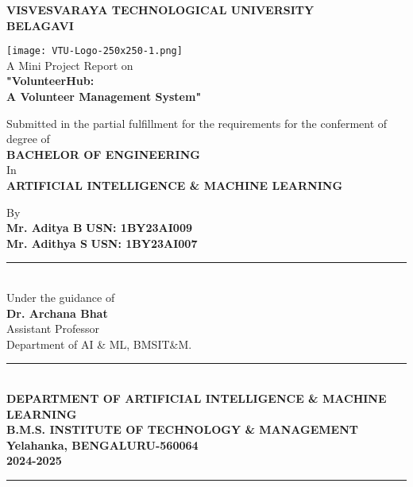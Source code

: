 \documentclass[12pt,a4paper]{report}
\begin{document}
\begin{titlepage}
    \centering
    \vspace*{-1cm}
    
    {\Large\textbf{VISVESVARAYA TECHNOLOGICAL UNIVERSITY}\\ \textbf{BELAGAVI}\\[1.5cm]}
    
    \texttt{[image: VTU-Logo-250x250-1.png]}\\[0.7cm]
    
    {\large A Mini Project Report on\\[0.3cm]}
    {\Huge\textbf{"VolunteerHub:\\[0.3cm] A Volunteer Management System"}\\[0.7cm]}
    
    {\large Submitted in the partial fulfillment for the requirements for the conferment of degree of\\[0.3cm]}
    {\Large\textbf{BACHELOR OF ENGINEERING}\\[0.3cm]}
    {\large In\\[0.3cm]}
    {\Large\textbf{ARTIFICIAL INTELLIGENCE \& MACHINE LEARNING}\\[0.7cm]}
    
    {\large By\\[0.3cm]}
    {\large\textbf{Mr. Aditya B} \hfill \textbf{USN: 1BY23AI009}\\[0.2cm]}
    {\large\textbf{Mr. Adithya S} \hfill \textbf{USN: 1BY23AI007}\\[1.2cm]}
    
    \rule{0.7\textwidth}{0.5pt}\\[0.3cm]
    
    {\large Under the guidance of\\[0.3cm]}
    {\large\textbf{Dr. Archana Bhat}\\[0.2cm]}
    {\large Assistant Professor\\[0.2cm]}
    {\large Department of AI \& ML, BMSIT\&M.\\[1.5cm]}
    
    \vfill
    
    \rule{\textwidth}{1pt}\\[0.3cm]
    {\Large\textbf{DEPARTMENT OF ARTIFICIAL INTELLIGENCE \& MACHINE LEARNING}\\[0.2cm]}
    {\Large\textbf{B.M.S. INSTITUTE OF TECHNOLOGY \& MANAGEMENT}\\[0.2cm]}
    {\Large\textbf{Yelahanka, BENGALURU-560064}\\[0.2cm]}
    {\Large\textbf{2024-2025}}\\[0.3cm]
    \rule{\textwidth}{1pt}
    
\end{titlepage}
\end{document}
